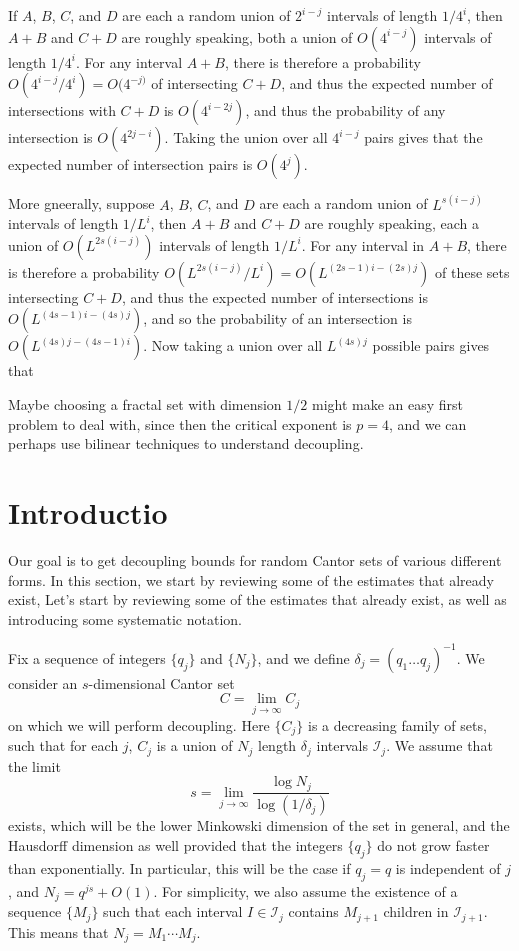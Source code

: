 \documentclass[dvipsnames,letterpaper,12pt]{article}
\numberwithin{equation}{section}
\numberwithin{theorem}{section}
\begin{document}
If $A$, $B$, $C$, and $D$ are each a random union of $2^{i-j}$ intervals of length $1/4^i$, then $A + B$ and $C + D$ are roughly speaking, both a union of $O(4^{i-j})$ intervals of length $1/4^i$. For any interval $A + B$, there is therefore a probability $O(4^{i-j} / 4^i) = O(4^{-j)}$ of intersecting $C + D$, and thus the expected number of intersections with $C + D$ is $O(4^{i-2j})$, and thus the probability of any intersection is $O(4^{2j-i})$. Taking the union over all $4^{i-j}$ pairs gives that the expected number of intersection pairs is $O(4^j)$.

More gneerally, suppose $A$, $B$, $C$, and $D$ are each a random union of $L^{s(i-j)}$ intervals of length $1/L^i$, then $A + B$ and $C + D$ are roughly speaking, each a union of $O(L^{2s(i-j)})$ intervals of length $1/L^i$. For any interval in $A + B$, there is therefore a probability $O(L^{2s(i-j)} / L^i) = O(L^{(2s - 1)i - (2s)j})$ of these sets intersecting $C + D$, and thus the expected number of intersections is $O(L^{(4s - 1)i - (4s)j})$, and so the probability of an intersection is $O(L^{(4s)j - (4s - 1)i})$. Now taking a union over all $L^{(4s)j}$ possible pairs gives that 

Maybe choosing a fractal set with dimension $1/2$ might make an easy first problem to deal with, since then the critical exponent is $p = 4$, and we can perhaps use bilinear techniques to understand decoupling.


\section{Introductio}

Our goal is to get decoupling bounds for random Cantor sets of various different forms. In this section, we start by reviewing some of the estimates that already exist, Let's start by reviewing some of the estimates that already exist, as well as introducing some systematic notation.

Fix a sequence of integers $\{ q_j \}$ and $\{ N_j \}$, and we define $\delta_j = (q_1 \dots q_j)^{-1}$. We consider an $s$-dimensional Cantor set
%
\[ C = \lim_{j \to \infty} C_j \]
%
on which we will perform decoupling. Here $\{ C_j \}$ is a decreasing family of sets, such that for each $j$, $C_j$ is a union of $N_j$ length $\delta_j$ intervals $\mathcal{I}_j$. We assume that the limit
%
\[ s = \lim_{j \to \infty} \frac{\log N_j}{\log(1/\delta_j)} \]
%
exists, which will be the lower Minkowski dimension of the set in general, and the Hausdorff dimension as well provided that the integers $\{ q_j \}$ do not grow faster than exponentially. In particular, this will be the case if $q_j = q$ is independent of $j$, and $N_j = q^{js} + O(1)$. For simplicity, we also assume the existence of a sequence $\{ M_j \}$ such that each interval $I \in \mathcal{I}_j$ contains $M_{j+1}$ children in $\mathcal{I}_{j+1}$. This means that $N_j = M_1 \cdots M_j$.
\end{document}
